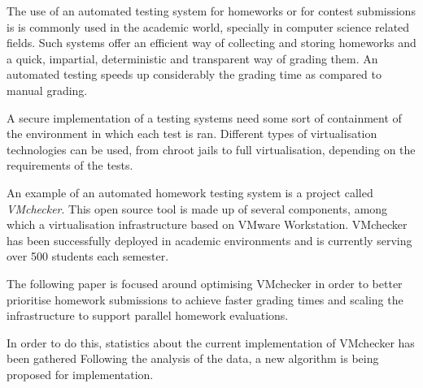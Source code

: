 The use of an automated testing system for homeworks or for contest
submissions is is commonly used in the academic world, specially in
computer science related fields. Such systems offer an efficient way of
collecting and storing homeworks and a quick, impartial, deterministic
and transparent way of grading them. An automated testing speeds up
considerably the grading time as compared to manual grading.

A secure implementation of a testing systems need some sort of containment
of the environment in which each test is ran. Different types of
virtualisation technologies can be used, from chroot jails to full
virtualisation, depending on the requirements of the tests.

An example of an automated homework testing system is a project called
\emph{VMchecker}. This open source tool is made up of several components,
among which a virtualisation infrastructure based on VMware Workstation.
VMchecker has been successfully deployed in academic environments and is
currently serving over 500 students each semester.

The following paper is focused around optimising VMchecker in order to
better prioritise homework submissions to achieve faster grading times and
scaling the infrastructure to support parallel homework evaluations.

In order to do this, statistics about the current implementation of
VMchecker has been gathered Following the analysis of the data, a new
algorithm is being proposed for implementation.
